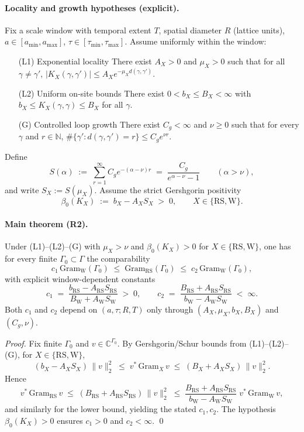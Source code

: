 \documentclass[11pt]{amsart}
\begin{document}
\paragraph{Locality and growth hypotheses (explicit).}
Fix a scale window with temporal extent $T$, spatial diameter $R$ (lattice units), $a\in[a_{\min},a_{\max}]$, $\tau\in[\tau_{\min},\tau_{\max}]$. Assume uniformly within the window:
\begin{itemize}
  \item[(L1) Exponential locality] There exist $A_X>0$ and $\mu_X>0$ such that for all $\gamma\ne\gamma'$, $|K_X(\gamma,\gamma')|\le A_X e^{-\mu_X d(\gamma,\gamma')}$.
  \item[(L2) Uniform on-site bounds] There exist $0<b_X\le B_X<\infty$ with $b_X\le K_X(\gamma,\gamma)\le B_X$ for all $\gamma$.
  \item[(G) Controlled loop growth] There exist $C_g<\infty$ and $\nu\ge 0$ such that for every $\gamma$ and $r\in\mathbb{N}$, $\#\{\gamma': d(\gamma,\gamma')=r\}\le C_g e^{\nu r}$.
\end{itemize}

Define
\[
  S(\alpha)\;:=\;\sum_{r=1}^\infty C_g e^{-(\alpha-\nu) r}\;=\;\frac{C_g}{e^{\alpha-\nu}-1}\qquad (\alpha>\nu),
\]
and write $S_X:=S(\mu_X)$. Assume the strict Gershgorin positivity
\[
  \beta_0(K_X)\;:=\;b_X - A_X S_X\;>\;0,\qquad X\in\{\mathrm{RS},\mathrm{W}\}.
\]

\paragraph{Main theorem (R2).}
Under (L1)--(L2)--(G) with $\mu_X>\nu$ and $\beta_0(K_X)>0$ for $X\in\{\mathrm{RS},\mathrm{W}\}$, one has for every finite $\Gamma_0\subset\Gamma$ the comparability
\[
  c_1\,\mathrm{Gram}_{\mathrm{W}}(\Gamma_0)\;\le\;\mathrm{Gram}_{\mathrm{RS}}(\Gamma_0)\;\le\;c_2\,\mathrm{Gram}_{\mathrm{W}}(\Gamma_0),
\]
with explicit window-dependent constants
\[
  c_1\;=\;\frac{b_{\mathrm{RS}}-A_{\mathrm{RS}} S_{\mathrm{RS}}}{B_{\mathrm{W}}+A_{\mathrm{W}} S_{\mathrm{W}}}\;>\;0,\qquad
  c_2\;=\;\frac{B_{\mathrm{RS}}+A_{\mathrm{RS}} S_{\mathrm{RS}}}{b_{\mathrm{W}}-A_{\mathrm{W}} S_{\mathrm{W}}}\;<\;\infty.
\]
Both $c_1$ and $c_2$ depend on $(a,\tau;R,T)$ only through $(A_X,\mu_X,b_X,B_X)$ and $(C_g,\nu)$.

\emph{Proof.}
Fix finite $\Gamma_0$ and $v\in\mathbb{C}^{\Gamma_0}$. By Gershgorin/Schur bounds from (L1)--(L2)--(G), for $X\in\{\mathrm{RS},\mathrm{W}\}$,
\[
  (b_X-A_X S_X)\,\|v\|_2^2\;\le\; v^*\,\mathrm{Gram}_X\,v\;\le\; (B_X+A_X S_X)\,\|v\|_2^2.
\]
Hence
\[
  v^*\,\mathrm{Gram}_{\mathrm{RS}}\,v\;\le\;(B_{\mathrm{RS}}+A_{\mathrm{RS}} S_{\mathrm{RS}})\,\|v\|_2^2\;\le\;\frac{B_{\mathrm{RS}}+A_{\mathrm{RS}} S_{\mathrm{RS}}}{b_{\mathrm{W}}-A_{\mathrm{W}} S_{\mathrm{W}}}\; v^*\,\mathrm{Gram}_{\mathrm{W}}\,v,
\]
and similarly for the lower bound, yielding the stated $c_1,c_2$. The hypothesis $\beta_0(K_X)>0$ ensures $c_1>0$ and $c_2<\infty$. \qed
\end{document}
